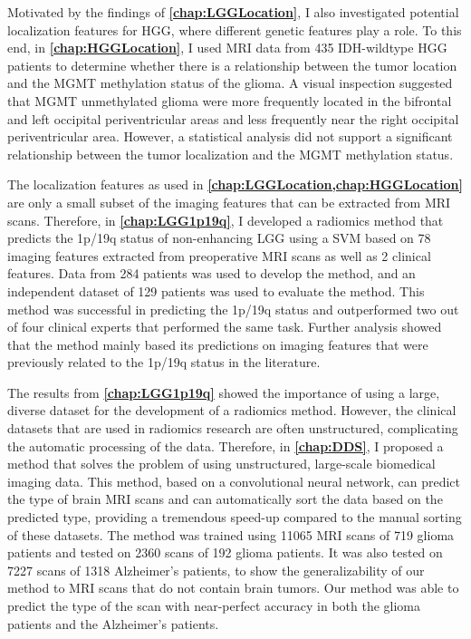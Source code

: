 Motivated by the findings of \textbf{\cref{chap:LGGLocation}}, I also investigated potential localization features for \gls{HGG}, where different genetic features play a role.
To this end, in \textbf{\cref{chap:HGGLocation}}, I used \gls{MRI} data from 435 \gls{IDH}-wildtype \gls{HGG} patients to determine whether there is a relationship between the \gls{tumor} location and the \gls{MGMT} methylation status of the glioma.
A visual inspection suggested that \gls{MGMT} unmethylated glioma were more frequently located in the bifrontal and left occipital periventricular areas and less frequently near the right occipital periventricular area.
However, a statistical analysis did not support a significant relationship between the \gls{tumor} localization and the \gls{MGMT} methylation status.

The localization features as used in \textbf{\cref{chap:LGGLocation,chap:HGGLocation}} are only a small subset of the imaging features that can be extracted from \gls{MRI} scans.
Therefore, in \textbf{\cref{chap:LGG1p19q}}, I developed a radiomics method that predicts the 1p/19q status of non-enhancing \gls{LGG} using a \gls{SVM} based on 78 imaging features extracted from preoperative \gls{MRI} scans as well as 2 clinical features.
Data from 284 patients was used to develop the method, and an independent dataset of 129 patients was used to evaluate the method.
This method was successful in predicting the 1p/19q status and outperformed two out of four clinical experts that performed the same task.
Further analysis showed that the method mainly based its predictions on imaging features that were previously related to the 1p/19q status in the literature.

The results from \textbf{\cref{chap:LGG1p19q}} showed the importance of using a large, diverse dataset for the development of a radiomics method.
However, the clinical datasets that are used in radiomics research are often unstructured, complicating the automatic processing of the data.
Therefore, in \textbf{\cref{chap:DDS}}, I proposed a method that solves the problem of using unstructured, large-scale biomedical imaging data.
This method, based on a convolutional neural network, can  predict the type of brain \gls{MRI} scans and can automatically sort the data based on the predicted type, providing a tremendous speed-up compared to the manual sorting of these datasets.
The method was trained using \num{11065} \gls{MRI} scans of 719 glioma patients and tested on \num{2360} scans of 192 glioma patients.
It was also tested on \num{7227} scans of \num{1318} Alzheimer's patients, to show the generalizability of our method to \gls{MRI} scans that do not contain brain \glspl{tumor}.
Our method was able to predict the type of the scan with near-perfect accuracy in both the glioma patients and the Alzheimer's patients.

